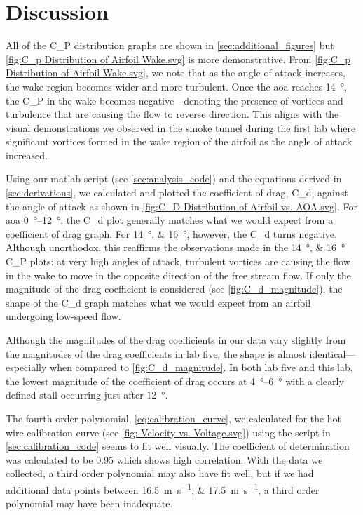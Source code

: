 \chapter{Discussion}
\label{cp:discussion}

All of the \gls{C_P} distribution graphs are shown in \autoref{sec:additional_figures} but \autoref{fig:C_p Distribution of Airfoil Wake.svg} is more demonstrative. From \autoref{fig:C_p Distribution of Airfoil Wake.svg}, we note that as the angle of attack increases, the wake region becomes wider and more turbulent. Once the \acrshort{aoa} reaches \qty{14}{\degree}, the \gls{C_P} in the wake becomes negative—denoting the presence of vortices and turbulence that are causing the flow to reverse direction. This aligns with the visual demonstrations we observed in the smoke tunnel during the first lab where significant vortices formed in the wake region of the airfoil as the angle of attack increased.

Using our \acrfull{matlab} script (see \autoref{sec:analysis_code}) and the equations derived in \autoref{sec:derivations}, we calculated and plotted the coefficient of drag, \gls{C_d}, against the angle of attack as shown in \autoref{fig:C_D Distribution of Airfoil vs. AOA.svg}. For \acrshort{aoa} \qtyrange{0}{12}{\degree}, the \gls{C_d} plot generally matches what we would expect from a coefficient of drag graph. For \qtylist{14;16}{\degree}, however, the \gls{C_d} turns negative. Although unorthodox, this reaffirms the observations made in the \qtylist{14;16}{\degree} \gls{C_P} plots: at very high angles of attack, turbulent vortices are causing the flow in the wake to move in the opposite direction of the free stream flow. If only the magnitude of the drag coefficient is considered (see \autoref{fig:C_d_magnitude}), the shape of the \gls{C_d} graph matches what we would expect from an airfoil undergoing low-speed flow.

Although the magnitudes of the drag coefficients in our data vary slightly from the magnitudes of the drag coefficients in lab five, the shape is almost identical—especially when compared to \autoref{fig:C_d_magnitude}. In both lab five and this lab, the lowest magnitude of the coefficient of drag occurs at \qtyrange{4}{6}{\degree} with a clearly defined stall occurring just after \qty{12}{\degree}.

The fourth order polynomial, \autoref{eq:calibration_curve}, we calculated for the hot wire calibration curve (see \autoref{fig: Velocity vs. Voltage.svg}) using the script in \autoref{sec:calibration_code} seems to fit well visually. The coefficient of determination was calculated to be \num{0.95} which shows high correlation. With the data we collected, a third order polynomial may also have fit well, but if we had additional data points between \qtylist{16.5;17.5}{\meter\per\second}, a third order polynomial may have been inadequate.